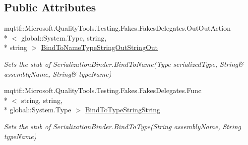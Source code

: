 \subsection*{Public Attributes}
\begin{DoxyCompactItemize}
\item 
mqttf\-::\-Microsoft.\-Quality\-Tools.\-Testing.\-Fakes.\-Fakes\-Delegates.\-Out\-Out\-Action\\*
$<$ global\-::\-System.\-Type, string, \\*
string $>$ \hyperlink{class_system_1_1_runtime_1_1_serialization_1_1_fakes_1_1_stub_serialization_binder_a67a9777e035e3feebb8381dfac024ba2}{Bind\-To\-Name\-Type\-String\-Out\-String\-Out}
\begin{DoxyCompactList}\small\item\em Sets the stub of Serialization\-Binder.\-Bind\-To\-Name(Type serialized\-Type, String\& assembly\-Name, String\& type\-Name)\end{DoxyCompactList}\item 
mqttf\-::\-Microsoft.\-Quality\-Tools.\-Testing.\-Fakes.\-Fakes\-Delegates.\-Func\\*
$<$ string, string, \\*
global\-::\-System.\-Type $>$ \hyperlink{class_system_1_1_runtime_1_1_serialization_1_1_fakes_1_1_stub_serialization_binder_a5a25ac40e3610031496b0ce32ed02b33}{Bind\-To\-Type\-String\-String}
\begin{DoxyCompactList}\small\item\em Sets the stub of Serialization\-Binder.\-Bind\-To\-Type(\-String assembly\-Name, String type\-Name)\end{DoxyCompactList}\end{DoxyCompactItemize}
